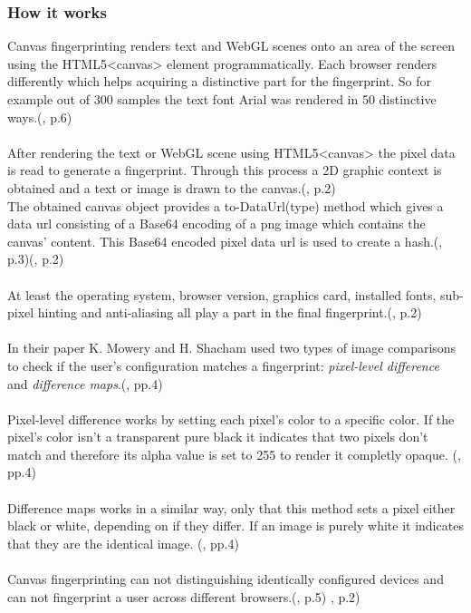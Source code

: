 \subsubsection{How it works}
Canvas fingerprinting renders text and WebGL scenes onto an area of the screen using the HTML5<canvas> element programmatically. Each browser renders differently which helps acquiring a distinctive part for the fingerprint. So for example out of 300 samples the text font Arial was rendered in 50 distinctive ways.(\textcite{mowery12}, p.6)\\\\
After rendering the text or WebGL scene using HTML5<canvas> the pixel data is read to generate a fingerprint. Through this process a 2D graphic context is obtained and a text or image is drawn to the canvas.(\textcite{upi15}, p.2)\\
The obtained canvas object provides a to-DataUrl(type) method which gives a data url consisting of a Base64 encoding of a png image which contains the canvas' content. This Base64 encoded pixel data url is used to create a hash.(\textcite{mowery12}, p.3)(\textcite{upi15}, p.2)\\\\
At least the operating system, browser version, graphics card, installed fonts, sub-pixel hinting and anti-aliasing all play a part in the final fingerprint.(\textcite{upi15}, p.2) \\\\
In their paper K. Mowery and H. Shacham used two types of image comparisons to check if the user's configuration matches a fingerprint: \textit{pixel-level difference} and \textit{difference maps}.(\textcite{mowery12}, pp.4)\\\\
Pixel-level difference works by setting each pixel's color to a specific color. If the pixel's color isn't a transparent pure black it indicates that two pixels don't match and therefore its alpha value is set to 255 to render it completly opaque. (\textcite{mowery12}, pp.4)\\\\
Difference maps works in a similar way, only that this method sets a pixel either black or white, depending on if they differ. If an image is purely white it indicates that they are the identical image. (\textcite{mowery12}, pp.4)\\\\
Canvas fingerprinting can not distinguishing identically configured devices and can not fingerprint a user across different browsers.(\textcite{mowery12}, p.5) \textcite{upi15}, p.2)

